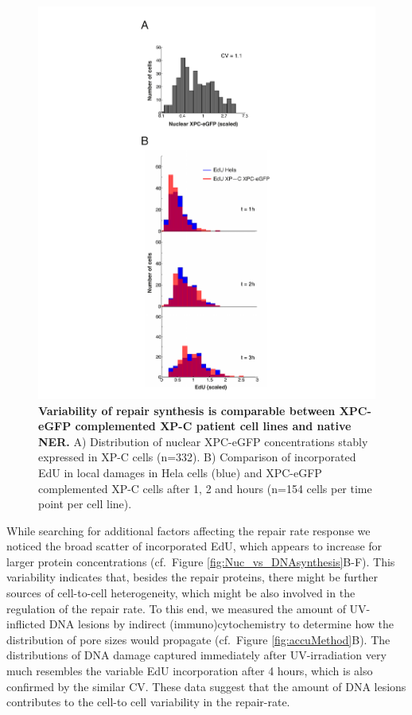 \begin{figure}[htbp]
	\begin{center}
		\includegraphics[width=1\textwidth]{Abbildungen/figure3_4.pdf}
		\caption{\textbf{Variability of repair synthesis is comparable between XPC-eGFP complemented XP-C patient cell lines and native NER.} A) Distribution of nuclear XPC-eGFP concentrations stably expressed in XP-C cells (n=332). B) Comparison of incorporated EdU in local damages in Hela cells (blue) and XPC-eGFP complemented XP-C cells after 1, 2 and hours (n=154 cells per time point per cell line). }
		\label{fig:consistVariability}
	\end{center}
\end{figure}

While searching for additional factors affecting the repair rate response we noticed the broad scatter of incorporated EdU, which appears to increase for larger protein concentrations (cf.\ Figure \ref{fig:Nuc_vs_DNAsynthesis}B-F). This variability indicates that, besides the repair proteins, there might be further sources of cell-to-cell heterogeneity, which might be also involved in the regulation of the repair rate. To this end, we measured the amount of UV-inflicted DNA lesions by indirect (immuno)cytochemistry to determine how the distribution of pore sizes would propagate (cf.\ Figure \ref{fig:accuMethod}B). The distributions of DNA damage captured immediately after UV-irradiation very much resembles the variable EdU incorporation after 4 hours, which is also confirmed by the similar CV. These data suggest that the amount of DNA lesions contributes to the cell-to cell variability in the repair-rate.  


